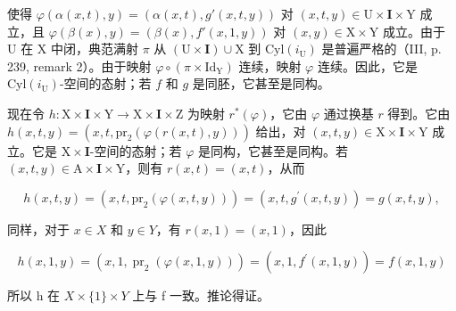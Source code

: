 使得 \(\varphi(\alpha(x,t),y) = (\alpha(x,t),g'(x,t,y))\) 对 \((x,t,y) \in \mathrm{U} \times \mathbf{I} \times \mathrm{Y}\) 成立，且 \(\varphi(\beta(x),y) = (\beta(x),f'(x,1,y))\) 对 \((x,y) \in \mathrm{X} \times \mathrm{Y}\) 成立。由于 U 在 X 中闭，典范满射 \(\pi\) 从 \((\mathrm{U} \times \mathbf{I}) \cup \mathrm{X}\) 到 \(\mathrm{Cyl}(i_{\mathrm{U}})\) 是普遍严格的（III, p. 239, remark 2）。由于映射 \(\varphi \circ (\pi \times \mathrm{Id}_{\mathrm{Y}})\) 连续，映射 \(\varphi\) 连续。因此，它是 \(\mathrm{Cyl}(i_{\mathrm{U}})\)-空间的态射；若 \(f\) 和 \(g\) 是同胚，它甚至是同构。

现在令 \(h \colon \mathrm{X} \times \mathbf{I} \times \mathrm{Y} \to \mathrm{X} \times \mathbf{I} \times \mathrm{Z}\) 为映射 \(r^*(\varphi)\)，它由 \(\varphi\) 通过换基 \(r\) 得到。它由 \(h(x,t,y) = (x,t,\mathrm{pr}_2(\varphi(r(x,t),y)))\) 给出，对 \((x,t,y) \in \mathrm{X} \times \mathbf{I} \times \mathrm{Y}\) 成立。它是 \(\mathrm{X} \times \mathbf{I}\)-空间的态射；若 \(\varphi\) 是同构，它甚至是同构。若 \((x,t,y) \in \mathrm{A} \times \mathbf{I} \times \mathrm{Y}\)，则有 \(r(x,t) = (x,t)\)，从而

\[
h (x, t, y) = (x, t, \mathrm{pr} _ {2} (\varphi (x, t, y))) = (x, t, g ^ {\prime} (x, t, y)) = g (x, t, y),
\]

同样，对于 \(x \in X\) 和 \(y \in Y\)，有 \(r(x,1) = (x,1)\)，因此

\[
h (x, 1, y) = (x, 1, \operatorname{pr} _ {2} (\varphi (x, 1, y))) = (x, 1, f ^ {\prime} (x, 1, y)) = f (x, 1, y)
\]

所以 h 在 \(X \times \{1\} \times Y\) 上与 f 一致。推论得证。

